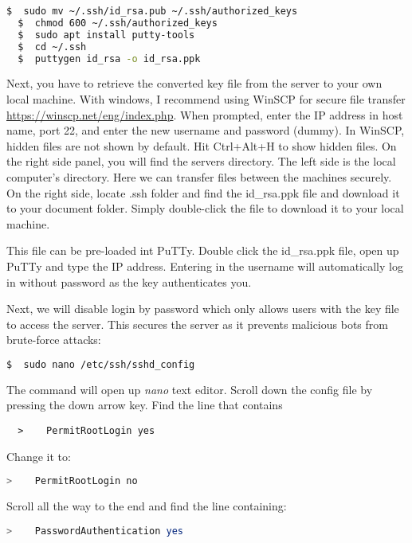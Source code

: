 \begin{lstlisting}[language=bash]
  $  sudo mv ~/.ssh/id_rsa.pub ~/.ssh/authorized_keys
  $  chmod 600 ~/.ssh/authorized_keys
  $  sudo apt install putty-tools
  $  cd ~/.ssh
  $  puttygen id_rsa -o id_rsa.ppk
\end{lstlisting}

Next, you have to retrieve the converted key file from the server to your own local machine. With windows, I recommend using WinSCP for secure file transfer \url{https://winscp.net/eng/index.php}. When prompted, enter the IP address in host name, port 22, and enter the new username and password (dummy). In WinSCP, hidden files are not shown by default. Hit Ctrl+Alt+H to show hidden files. On the right side panel, you will find the servers directory. The left side is the local computer's directory. Here we can transfer files between the machines securely. On the right side, locate .ssh folder and find the id\_rsa.ppk file and download it to your document folder. Simply double-click the file to download it to your local machine.

This file can be pre-loaded int PuTTy. Double click the id\_rsa.ppk file, open up PuTTy and type the IP address. Entering in the username will automatically log in without password as the key authenticates you.

Next, we will disable login by password which only allows users with the key file to access the server. This secures the server as it prevents malicious bots from brute-force attacks:

\begin{lstlisting}[language=bash]
  $  sudo nano /etc/ssh/sshd_config
\end{lstlisting}

The command will open up \emph{nano} text editor. Scroll down the config file by pressing the down arrow key. Find the line that contains

\begin{lstlisting}
  >    PermitRootLogin yes
\end{lstlisting}

Change it to:

\begin{lstlisting}[language=bash]
  >    PermitRootLogin no
\end{lstlisting}

Scroll all the way to the end and find the line containing:

\begin{lstlisting}[language=bash]
  >    PasswordAuthentication yes
\end{lstlisting}

